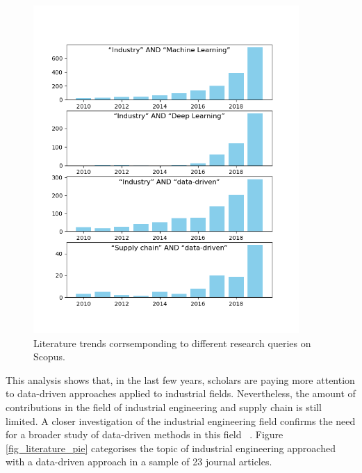 \begin{figure}[hbt!]
\centering
\includegraphics[width=0.9\textwidth]{SectionIntroduction/researchBackground_figures/fig_literature_trend.png}
\captionsetup{type=figure}
\caption{Literature trends corrsemponding to different research queries on Scopus.}
\label{fig_literature_trend}
\end{figure}

This analysis shows that, in the last few years, scholars are paying more attention to data-driven approaches applied to industrial fields. Nevertheless, the amount of contributions in the field of industrial engineering and supply chain is still limited. A closer investigation of the industrial engineering field confirms the need for a broader study of data-driven methods in this field ~\cite{Nguyen2018}. Figure \ref{fig_literature_pie} categorises the topic of industrial engineering approached with a data-driven approach in a sample of 23 journal articles.

